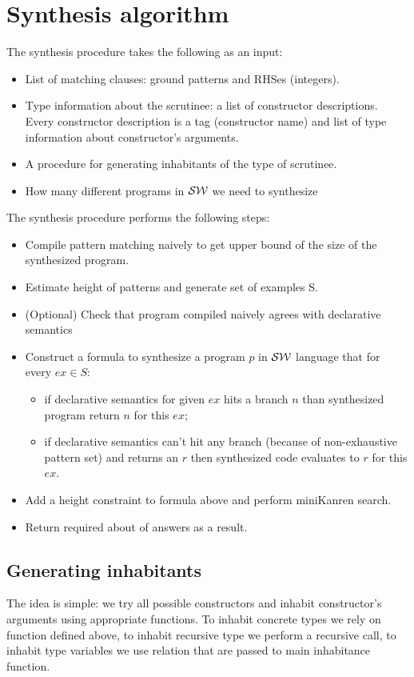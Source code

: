 \section{Synthesis algorithm}


The synthesis procedure takes the following as an input:
\begin{itemize}
\item List of matching clauses: ground patterns and RHSes (integers).
\item Type information about the scrutinee: a list of constructor descriptions. Every constructor description is a tag (constructor name) and list of type information about constructor's arguments.
\item A procedure for generating inhabitants of the type of scrutinee.
\item How many different programs in $\mathcal{S}\mathcal{W}$ we need to synthesize
\end{itemize}

The synthesis procedure performs the following steps:
\begin{itemize}
\item Compile pattern matching naively to get upper bound of the size of the synthesized program.
\item Estimate height of patterns and generate set of examples S.
\item (Optional) Check that program compiled naively agrees with declarative semantics
\item Construct a formula to synthesize a program $p$ in $\mathcal{S}\mathcal{W}$ language that for every $ex\in S$:
\begin{itemize}
\item if declarative semantics for given $ex$ hits a branch $n$ than synthesized program return $n$ for this $ex$;
\item if declarative semantics can't hit any branch (because of non-exhaustive pattern set) and returns an $r$ then synthesized code evaluates to $r$ for this $ex$.
\end{itemize}
\item Add a height constraint to formula above and perform miniKanren search.
\item Return required about of answers as a result.
\end{itemize}

\subsection{Generating inhabitants}
The idea is simple: we try all possible constructors and inhabit constructor's arguments using appropriate functions. To inhabit concrete types we rely on function defined above, to inhabit recursive type we perform a recursive call, to inhabit type variables we use relation that are passed to main inhabitance function.

